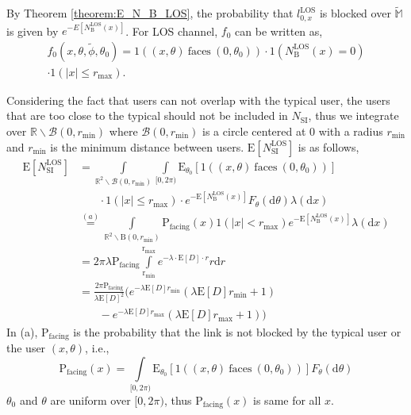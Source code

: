 \documentclass[10pt, conference, letterpaper]{IEEEtran}
\begin{document}
By Theorem \ref{theorem:E_N_B_LOS}, the probability that $l_{0,x}^{\mathrm{LOS}}$ is blocked over $\mathbb{\tilde{M}}$ is given by $e^{-E[N_\mathrm{B}^\mathrm{LOS}(x)]}$. For LOS channel, $f_0$ can be written as, 
\begin{multline}\label{eq:f0_LOS}
	f_0(x,\theta, \tilde{\phi},\theta_0)=\text{1}((x,\theta)\mathrm{~faces~}(0,\theta_0))\cdot\mathrm{1}(N_\mathrm{B}^\mathrm{LOS}(x)=0) \\
	\cdot\text{1}(|x|\leq r_{\max}). 
\end{multline}

Considering the fact that users can not overlap with the typical user, the users that are too close to the typical should not be included in $N_{\mathrm{SI}}$, thus we integrate over $\mathbb{R}\backslash{\mathcal{B}(0, r_{\min})}$ where $\mathcal{B}(0, r_{\min})$ is a circle centered at $0$ with a radius $r_{\min}$ and $r_{\min}$ is the minimum distance between users. 
$\mathrm{E}[N_{\mathrm{SI}}^{\text{LOS}}]$ is as follows, 
\begin{equation}
\begin{aligned}
\mathrm{E}[N_{\mathrm{SI}}^{\text{LOS}}] &= \int\limits_{\mathbb{R}^2\backslash\mathcal{B}(0,r_{\text{min}})} \int\limits_{[0,2\pi)}\mathrm{E}_{\theta_0}[\text{1}((x,\theta)\mathrm{~faces~}(0,\theta_0))]\\
& \phantom{{}=1} \cdot\text{1}(|x|\leq r_{\max})\cdot e^{-\mathrm{E}[N_{\mathrm{B}}^\mathrm{LOS}(x)]}F_{\theta}(\mathrm{d}\theta)\lambda(\mathrm{d}x)\\
& \stackrel{(a)} = \int\limits_{\mathbb{R}^2\backslash\mathrm{B}(0,r_{\text{min}})}
\mathrm{P}_{\text{facing}}(x)\text{1}(|x|<r_{\text{max}})e^{-\mathrm{E}[N_{\mathrm{B}}^\mathrm{LOS}(x)]}\lambda(\mathrm{d}x)\\
& = 2\pi\lambda \mathrm{P}_{\text{facing}}\int\limits_{\mathrm{r_{min}}}^{\mathrm{r_{max}}}e^{-\lambda\cdot\mathrm{E}[D]\cdot r}r\mathrm{d}r\\
& =\frac{2\pi \mathrm{P}_{\text{facing}}}{\lambda \mathrm{E}[D]^2}\big( e^{-\lambda\mathrm{E}[D]r_{\mathrm{min}}}(\lambda\mathrm{E}[D]r_{\mathrm{min}} + 1)\\
& \phantom{{}=1} - e^{-\lambda\mathrm{E}[D]r_{\mathrm{max}}}(\lambda\mathrm{E}[D]r_{\mathrm{max}} + 1)\big)
\end{aligned} 
\end{equation}
In (a), $\mathrm{P}_{\text{facing}}$ is the probability that the link is not blocked by the typical user or the user $(x,\theta)$, i.e.,
\begin{equation*}
\mathrm{P}_{\text{facing}}(x) = \int\limits_{[0,2\pi)}\mathrm{E}_{\theta_0}[\text{1}((x,\theta)\mathrm{~faces~}(0,\theta_0))]F_{\theta}(\mathrm{d}\theta)
\end{equation*}
$\theta_0$ and $\theta$ are uniform over $[0, 2\pi)$, thus $\mathrm{P}_{\text{facing}}(x)$ is same for all $x$.
\end{document}
